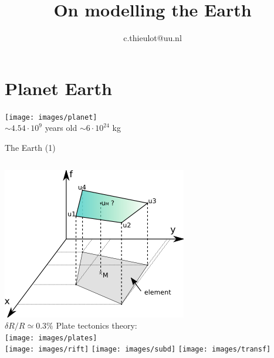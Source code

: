 \documentclass[handout]{beamer}
\title{On modelling the Earth} %
\author{c.thieulot@uu.nl}
\begin{document}
  \frame{\maketitle}



\section{Planet Earth}

\begin{frame}[plain]{}
\texttt{[image: images/planet]}\\
$\sim4.54 \cdot 10^9$ years old
\hspace{4.5cm}
$\sim 6\cdot10^{24}$ kg
\end{frame}

\begin{frame}[plain]{The Earth (1)}
\begin{columns}[onlytextwidth]
\includegraphics[width=1.\textwidth]{images/shape}\\
$\delta R/R \simeq 0.3\%$
Plate tectonics theory:\\
\texttt{[image: images/plates]}\\
\texttt{[image: images/rift]}
\texttt{[image: images/subd]}
\texttt{[image: images/transf]}
\end{columns}
\end{frame}
\end{document}
